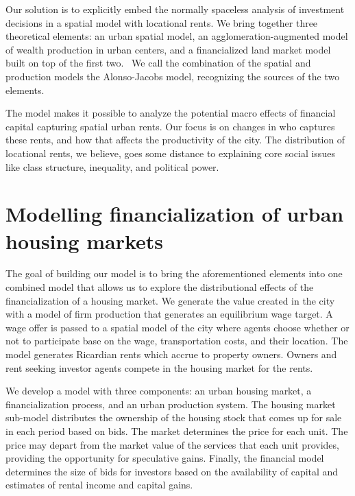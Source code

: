  Our solution is to explicitly embed the normally spaceless analysis of investment decisions in a spatial model with locational rents. 
We bring together three theoretical elements: an urban spatial model,  an agglomeration-augmented model of wealth production in urban centers, and a financialized land market model built on top of the first two.\ %
 We call the combination of the spatial and production models the Alonso-Jacobs model, recognizing the sources of the two elements. 

The model makes it possible to analyze the potential macro effects of financial capital capturing spatial urban rents. Our focus is on changes in who captures these rents, and how that affects the productivity of the city. The distribution of locational rents, we believe, goes some distance to explaining core social issues like class structure, inequality, and political power.

\section{Modelling financialization of urban housing markets}
The goal of building our model is to bring the aforementioned elements into one combined model that allows us to explore the distributional effects of the financialization of a housing market.  
We generate the value created in the city with a model of firm production that generates an equilibrium wage target. A wage offer is passed to  a spatial model of the city where agents choose whether or not to participate base on the wage, transportation costs, and their location. The model generates Ricardian rents which accrue to property owners. Owners and rent seeking investor agents compete in the housing market for the rents. %

We develop a model with three components: an urban housing market, a financialization process, and an urban production system. The housing market sub-model distributes the ownership of the housing stock that comes up for sale in each period based on bids. %
The market determines the price for each unit. The price may depart from the market value of the services that each unit provides, providing the opportunity for speculative gains. Finally, the financial model determines the size of bids for investors based on the availability of capital and estimates of rental income and capital gains.

